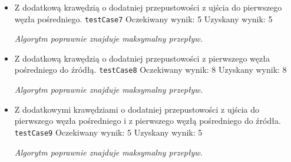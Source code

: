 \begin{itemize}[nosep]
    \item Z dodatkową krawędzią o dodatniej przepustowości z ujścia do
    pierwszego węzła pośredniego.
    \texttt{testCase7}
    Oczekiwany wynik: 5
    Uzyskany wynik: 5

    \emph{Algorytm poprawnie znajduje maksymalny przepływ.}

    \item Z dodatkową krawędzią o dodatniej przepustowości z pierwszego węzła
    pośredniego do źródłą.
    \texttt{testCase8}
    Oczekiwany wynik: 8
    Uzyskany wynik: 8

    \emph{Algorytm poprawnie znajduje maksymalny przepływ.}

    \item Z dodatkowymi krawędziami o dodatniej przepustowości z ujścia do
    pierwszego węzła pośredniego i z pierwszego węzłą pośredniego do źródła.
    \texttt{testCase9}
    Oczekiwany wynik: 5
    Uzyskany wynik: 5

    \emph{Algorytm poprawnie znajduje maksymalny przepływ.}
\end{itemize}


